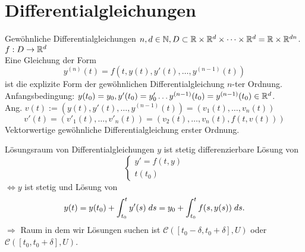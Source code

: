 \documentclass[main.tex]{subfiles}
\begin{document}
\section*{Differentialgleichungen}

\begin{karte}{Gewöhnliche Differentialgleichungen}
    \(n, d \in \N, D \subset \R \times \R^d \times \cdots \times \R^d = \R \times \R^{dn}\).\\
    \(\abb{f}{D}{\R^d}\)\\
    Eine Gleichung der Form 
    \[ y^{(n)}(t) = f(t, y(t), y'(t), \ldots, y^{(n-1)}(t)) \]
    ist die explizite Form der gewöhnlichen Differentialgleichung \(n\)-ter Ordnung.\\
    Anfangsbedingung: \( y(t_0) = y_0, y'(t_0) = y'_0 
    \ldots y^{(n-1)}(t_0) = y^{(n-1)}(t_0) \in \R^d \).\\
    Ang. \( v(t) := (y(t), y'(t), \ldots, y^{(n-1)}(t)) = (v_1(t), \ldots, v_n(t)) \)\\
    \[ v'(t) = (v'_1(t), \ldots, v'_n(t)) 
    = (v_2(t), \ldots, v_n(t), f(t,v(t))) \]
    Vektorwertige gewöhnliche Differentialgleichung erster Ordnung.
\end{karte}

\begin{karte}{Lösungsraum von Differentialgleichungen}
    \( y \) ist stetig differenzierbare Lösung 
    von \[ \begin{cases}
        y' = f(t,y) \\
        t(t_0)
    \end{cases} \]
    \( \Leftrightarrow y \) ist stetig und 
    Lösung von 
    \[ y(t) = y(t_0) + \integralx{y'(s)}{t_0}{t}{s} 
    = y_0 + \integralx{f(s, y(s))}{t_0}{t}{s}. \]
    \(\Rightarrow \) Raum in dem wir Lösungen suchen ist 
    \(\mathcal{C}([t_0-\delta, t_0+\delta], U)\)
    oder \(\mathcal{C}([t_0, t_0+\delta], U)\).
\end{karte}
\end{document}
